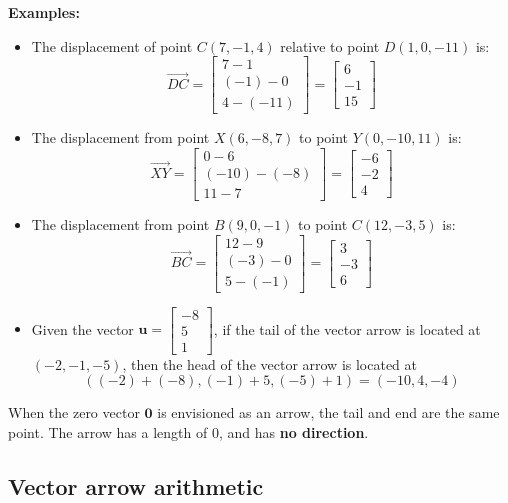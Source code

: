 \documentclass{article}
\begin{document}
\textbf{Examples:}
\begin{itemize}
\item The displacement of point \(C(7, -1, 4)\) relative to point \(D(1, 0, -11)\) is:
\[\overrightarrow{DC} = \begin{bmatrix} 7 - 1 \\ (-1) - 0 \\ 4 - (-11) \end{bmatrix} = \begin{bmatrix} 6 \\ -1 \\ 15 \end{bmatrix}\]
\item The displacement from point \(X(6, -8, 7)\) to point \(Y(0, -10, 11)\) is:
\[\overrightarrow{XY} = \begin{bmatrix} 0 - 6 \\ (-10) - (-8) \\ 11 - 7 \end{bmatrix} = \begin{bmatrix} -6 \\ -2 \\ 4 \end{bmatrix}\]
\item The displacement from point \(B(9, 0, -1)\) to point \(C(12, -3, 5)\) is:
\[\overrightarrow{BC} = \begin{bmatrix} 12 - 9 \\ (-3) - 0 \\ 5 - (-1) \end{bmatrix} = \begin{bmatrix} 3 \\ -3 \\ 6 \end{bmatrix}\]
\item Given the vector \(\mathbf{u} = \begin{bmatrix} -8 \\ 5 \\ 1 \end{bmatrix}\), if the tail of the vector arrow is located at \((-2, -1, -5)\), then the head of the vector arrow is located at 
\[((-2)+(-8), (-1)+5, (-5)+1) = (-10, 4, -4)\]  
\end{itemize}

When the zero vector \(\mathbf{0}\) is envisioned as an arrow, the tail and end are the same point. The arrow has a length of \(0\), and has {\bf no direction}. 


\subsection*{Vector arrow arithmetic}
\end{document}
